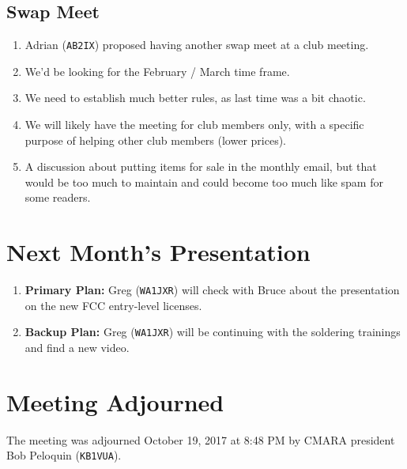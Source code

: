 \documentclass[10pt,letterpaper]{article}
\begin{document}
\subsection{Swap Meet}
\begin{enumerate}
  \item Adrian (\texttt{AB2IX}) proposed having another swap meet at a club meeting.
  \item We'd be looking for the February / March time frame.
  \item We need to establish much better rules, as last time was a bit chaotic.
  \item We will likely have the meeting for club members only, with a specific purpose of helping other club members (lower prices).
  \item A discussion about putting items for sale in the monthly email, but that would be too much to maintain and could become too much like spam for some readers.
\end{enumerate}

\section{Next Month's Presentation}
\begin{enumerate}
  \item \textbf{Primary Plan:} Greg (\texttt{WA1JXR}) will check with Bruce about the presentation on the new FCC entry-level licenses.
  \item \textbf{Backup Plan:} Greg (\texttt{WA1JXR}) will be continuing with the soldering trainings and find a new video.
\end{enumerate}

\section{Meeting Adjourned}
The meeting was adjourned October 19, 2017 at 8:48 PM by CMARA president Bob Peloquin (\texttt{KB1VUA}).
\end{document}
